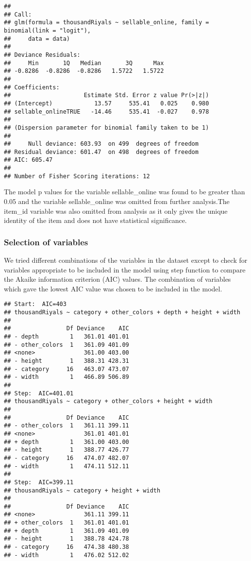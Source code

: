 \documentclass[
]{article}
\begin{document}
\begin{verbatim}
## 
## Call:
## glm(formula = thousandRiyals ~ sellable_online, family = binomial(link = "logit"), 
##     data = data)
## 
## Deviance Residuals: 
##     Min       1Q   Median       3Q      Max  
## -0.8286  -0.8286  -0.8286   1.5722   1.5722  
## 
## Coefficients:
##                     Estimate Std. Error z value Pr(>|z|)
## (Intercept)            13.57     535.41   0.025    0.980
## sellable_onlineTRUE   -14.46     535.41  -0.027    0.978
## 
## (Dispersion parameter for binomial family taken to be 1)
## 
##     Null deviance: 603.93  on 499  degrees of freedom
## Residual deviance: 601.47  on 498  degrees of freedom
## AIC: 605.47
## 
## Number of Fisher Scoring iterations: 12
\end{verbatim}

The model p values for the variable sellable\_online was found to be
greater than 0.05 and the variable sellable\_online was omitted from
further analysis.The item\_id variable was also omitted from analysis as
it only gives the unique identity of the item and does not have
statistical significance.

\hypertarget{selection-of-variables}{%
\subsubsection{Selection of variables}\label{selection-of-variables}}

We tried different combinations of the variables in the dataset except
to check for variables appropriate to be included in the model using
step function to compare the Akaike information criterion (AIC) values.
The combination of variables which gave the lowest AIC value was chosen
to be included in the model.

\begin{verbatim}
## Start:  AIC=403
## thousandRiyals ~ category + other_colors + depth + height + width
## 
##                Df Deviance    AIC
## - depth         1   361.01 401.01
## - other_colors  1   361.09 401.09
## <none>              361.00 403.00
## - height        1   388.31 428.31
## - category     16   463.07 473.07
## - width         1   466.89 506.89
## 
## Step:  AIC=401.01
## thousandRiyals ~ category + other_colors + height + width
## 
##                Df Deviance    AIC
## - other_colors  1   361.11 399.11
## <none>              361.01 401.01
## + depth         1   361.00 403.00
## - height        1   388.77 426.77
## - category     16   474.07 482.07
## - width         1   474.11 512.11
## 
## Step:  AIC=399.11
## thousandRiyals ~ category + height + width
## 
##                Df Deviance    AIC
## <none>              361.11 399.11
## + other_colors  1   361.01 401.01
## + depth         1   361.09 401.09
## - height        1   388.78 424.78
## - category     16   474.38 480.38
## - width         1   476.02 512.02
\end{verbatim}
\end{document}
